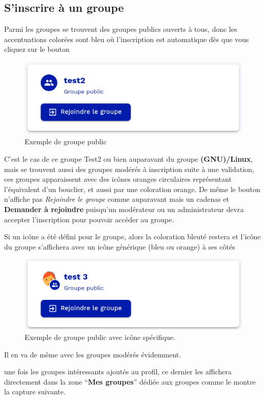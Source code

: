 \subsection{S'inscrire à un groupe}
Parmi les groupes se trouvent des groupes publics ouverts à tous, donc les accentuations colorées sont bleu où l'inscription est automatique dès que vous cliquez sur le bouton 
\begin{figure}
	\centering
	\includegraphics[width=0.500\linewidth]{Captures/portail.groupe.exemple.public.png}
	\caption{Exemple de groupe public}
\end{figure}
C'est le cas de ce groupe Test2 ou bien auparavant du groupe \textbf{(GNU)/Linux}, mais se trouvent aussi des groupes modérés à inscription suite à une validation, ces groupes apparaissent avec des icônes oranges circulaires représentant l'équivalent d'un bouclier, et aussi par une coloration orange. 
De même le bouton n'affiche pas \emph{Rejoindre le groupe} comme auparavant mais un cadenas et \textbf{Demander à rejoindre} puisqu'un modérateur ou un administrateur devra accepter l'inscription pour pouvoir accéder au groupe.

Si un icône a été défini pour le groupe, alors la coloration bleuté restera et l'icône du groupe s'affichera avec un icône générique (bleu ou orange) à ses côtés

\begin{figure}
	\centering
	\includegraphics[width=0.500\linewidth]{./Captures/portail.groupe.exemple.public.avec.icone.png}
	\caption{Exemple de groupe public avec icône spécifique.}
\end{figure}

Il en va de même avec les groupes modérés évidemment.

une fois les groupes intéressants ajoutés au profil, ce dernier les affichera directement dans la zone ``\textbf{Mes groupes}'' dédiée aux groupes comme le montre la capture suivante.

